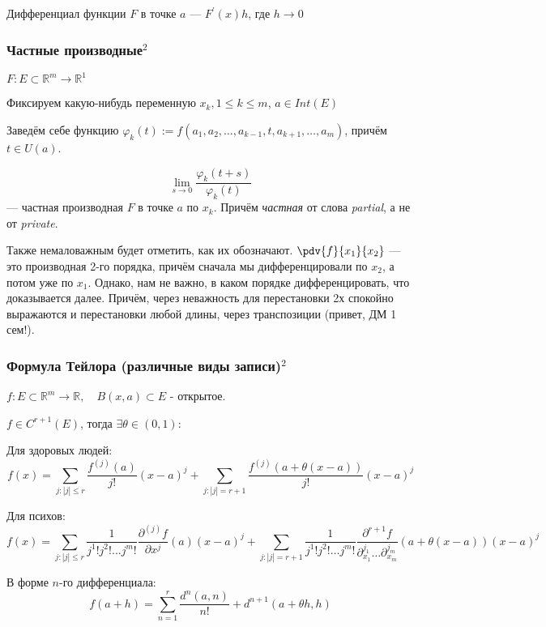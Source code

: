 \documentclass{article}
\begin{document}
Дифференциал функции $F$ в точке $a$ --- $F^\prime(x)h$, где $h \rightarrow 0$

\subsubsection{Частные производные\texorpdfstring{$^2$}{}}

$F : E \subset \mathbb{R}^m \rightarrow \mathbb{R}^1 $

Фиксируем какую-нибудь переменную $x_k, 1 \le k \le m$, $a \in Int(E)$

Заведём себе функцию $\varphi_k(t) := f(a_1, a_2, \ldots, a_{k - 1}, t, a_{k + 1}, \ldots, a_m)$, причём $t \in U(a)$.

\[\lim_{s \rightarrow 0} \frac{\varphi_k(t + s)}{\varphi_k(t)}\] --- частная производная $F$ в точке
$a$ по $x_k$. Причём \textit{частная} от слова \textit{partial}, а не от \textit{private}.

Также немаловажным будет отметить, как их обозначают. $\pdv{f}{x_1}{x_2}$ --- это производная 2-го порядка, причём сначала мы дифференцировали по $x_2$, а потом уже по $x_1$. Однако, нам не важно, в каком порядке дифференцировать, что доказывается далее. Причём, через неважность для перестановки 2х спокойно выражаются и перестановки любой длины, через транспозиции (привет, ДМ 1 сем!).



\subsubsection{Формула Тейлора (различные виды записи)\texorpdfstring{$^2$}{}}


$f: E \subset \mathbb R^m \to \mathbb R,\quad B(x,a) \subset E$ - открытое.

$f \in C^{r + 1}(E)$, тогда $\exists \theta \in (0,1):$

Для здоровых людей:
$$
f(x) = \sum_{j: |j| \leq r} \frac{f^{(j)}(a)}{j!}(x-a)^j + \sum_{j: |j| = r + 1} \frac{f^{(j)} (a + \theta(x-a))}{j!} (x-a)^j
$$

Для психов:
$$
f(x) = \sum_{j:|j| \leq r} \frac{1}{j^1!j^2!\dots j^m!} \frac {\partial^{(j)}f}{\partial x^j}(a) (x-a)^j + \sum_{j:|j|= r + 1} \frac{1} {j^1!j^2!\dots j^m!} \frac{\partial^{r + 1} f} {\partial_{x_1}^{j_1}\dots \partial_{x_m}^{j_m}} (a + \theta(x-a)) (x-a)^j
$$

В форме $n$-го дифференциала:
$$
f(a + h) = \sum_{n=1}^r \frac{d^n(a, n)}{n!} + d^{n+1}(a + \theta h, h)
$$
\end{document}
